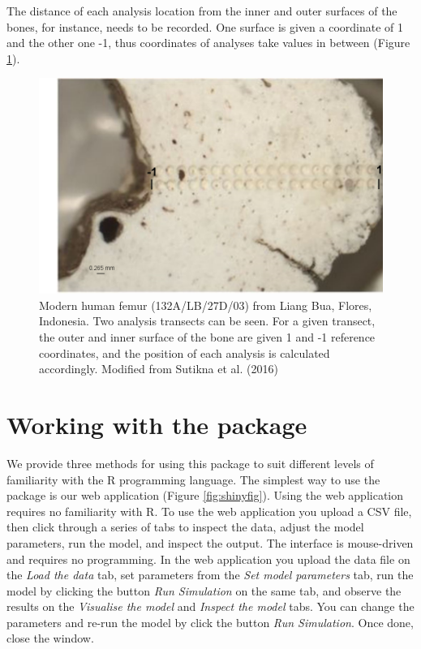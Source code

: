\documentclass[]{elsarticle} %
\begin{document}
The distance of each analysis location from the inner and outer surfaces of the bones, for instance, needs to be recorded. One surface is given a coordinate of 1 and the other one -1, thus coordinates of analyses take values in between (Figure \ref{fig:femurpic}).



\begin{figure}
\includegraphics[width=0.95\linewidth]{figures/bone} \caption{Modern human femur (132A/LB/27D/03) from Liang Bua, Flores, Indonesia. Two analysis transects can be seen. For a given transect, the outer and inner surface of the bone are given 1 and -1 reference coordinates, and the position of each analysis is calculated accordingly. Modified from Sutikna et al. (2016)}\label{fig:femurpic}
\end{figure}

\FloatBarrier

\hypertarget{working-with-the-package}{%
\section{Working with the package}\label{working-with-the-package}}

We provide three methods for using this package to suit different levels of familiarity with the R programming language. The simplest way to use the package is our web application (Figure \ref{fig:shinyfig}). Using the web application requires no familiarity with R. To use the web application you upload a CSV file, then click through a series of tabs to inspect the data, adjust the model parameters, run the model, and inspect the output. The interface is mouse-driven and requires no programming. In the web application you upload the data file on the \emph{Load the data} tab, set parameters from the \emph{Set model parameters} tab, run the model by clicking the button \emph{Run Simulation} on the same tab, and observe the results on the \emph{Visualise the model} and \emph{Inspect the model} tabs. You can change the parameters and re-run the model by click the button \emph{Run Simulation}. Once done, close the window.
\end{document}
